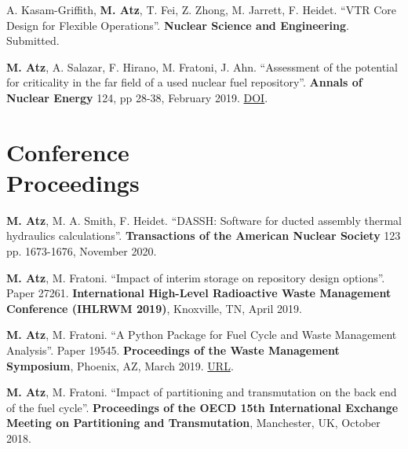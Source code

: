 \documentclass[margin,line]{resume}
\begin{document}
\begin{resume}
\begin{bibenum}
    \item A. Kasam-Griffith, \textbf{M. Atz}, T. Fei, Z. Zhong, M. Jarrett, F. Heidet. ``VTR Core Design for Flexible Operations''. \textbf{Nuclear Science and Engineering}. Submitted.


    \item \textbf{M. Atz}, A. Salazar, F. Hirano, M. Fratoni, J. Ahn. ``Assessment of the potential for criticality in the far field of a used nuclear fuel repository''. \textbf{Annals of Nuclear Energy} 124, pp 28-38, February 2019. \href{https://doi.org/10.1016/j.anucene.2018.09.028}{DOI}.
    
\end{bibenum}
\section{\mysidestyle Conference\\Proceedings}
\begin{bibenum}

    \item \textbf{M. Atz}, M. A. Smith, F. Heidet. ``DASSH: Software for ducted assembly thermal hydraulics calculations''. \textbf{Transactions of the American Nuclear Society} 123 pp. 1673-1676, November 2020.

    \item \textbf{M. Atz}, M. Fratoni. ``Impact of interim storage on repository design options''. Paper 27261. \textbf{International High-Level Radioactive Waste Management Conference (IHLRWM 2019)}, Knoxville, TN, April 2019.
    
    \item \textbf{M. Atz}, M. Fratoni. ``A Python Package for Fuel Cycle and Waste Management Analysis''. Paper 19545. \textbf{Proceedings of the Waste Management Symposium}, Phoenix, AZ, March 2019. \href{http://amz.xcdsystem.com/A464D2CF-E476-F46B-841E415B85C431CC_finalpapers_2019/FinalPaper_19545_0121045947.pdf}{URL}.
    
    \item \textbf{M. Atz}, M. Fratoni. ``Impact of partitioning and transmutation on the back end of the fuel cycle''. \textbf{Proceedings of the OECD 15th International Exchange Meeting on Partitioning and Transmutation}, Manchester, UK, October 2018.
    

\end{bibenum}
\end{resume}
\end{document}
